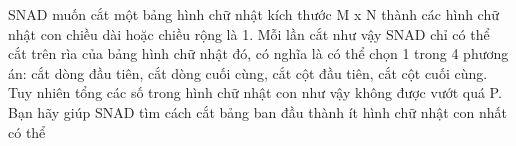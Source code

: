 SNAD muốn cắt một bảng hình chữ nhật kích thước M x N thành các hình chữ nhật con chiều dài hoặc chiều rộng là 1. Mỗi lần cắt như vậy SNAD chỉ có thể cắt trên rìa của bảng hình chữ nhật đó, có nghĩa là có thể chọn 1 trong 4 phương án: cắt dòng đầu tiên, cắt dòng cuối cùng, cắt cột đầu tiên, cắt cột cuối cùng. Tuy nhiên tổng các số trong hình chữ nhật con như vậy không được vướt quá P. Bạn hãy giúp SNAD tìm cách cắt bảng ban đầu thành ít hình chữ nhật con nhất có thể  

\